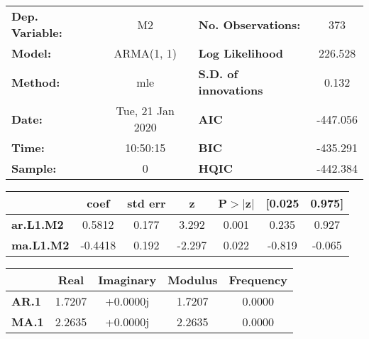 \begin{center}
\begin{tabular}{lclc}
\toprule
\textbf{Dep. Variable:} &             M2            & \textbf{  No. Observations:  } &            373             \\
\textbf{Model:}         &         ARMA(1, 1)        & \textbf{  Log Likelihood     } &          226.528           \\
\textbf{Method:}        &            mle            & \textbf{  S.D. of innovations} &           0.132            \\
\textbf{Date:}          &      Tue, 21 Jan 2020     & \textbf{  AIC                } &          -447.056          \\
\textbf{Time:}          &          10:50:15         & \textbf{  BIC                } &          -435.291          \\
\textbf{Sample:}        &             0             & \textbf{  HQIC               } &          -442.384          \\
\bottomrule
\end{tabular}
\begin{tabular}{lcccccc}
                  & \textbf{coef} & \textbf{std err} & \textbf{z} & \textbf{P$>$$|$z$|$} & \textbf{[0.025} & \textbf{0.975]}  \\
\midrule
\textbf{ar.L1.M2} &       0.5812  &        0.177     &     3.292  &         0.001        &        0.235    &        0.927     \\
\textbf{ma.L1.M2} &      -0.4418  &        0.192     &    -2.297  &         0.022        &       -0.819    &       -0.065     \\
\bottomrule
\end{tabular}
\begin{tabular}{lcccc}
              & \textbf{            Real} & \textbf{         Imaginary} & \textbf{         Modulus} & \textbf{        Frequency}  \\
\midrule
\textbf{AR.1} &                1.7207     &                +0.0000j     &                1.7207     &                0.0000       \\
\textbf{MA.1} &                2.2635     &                +0.0000j     &                2.2635     &                0.0000       \\
\bottomrule
\end{tabular}
\end{center}